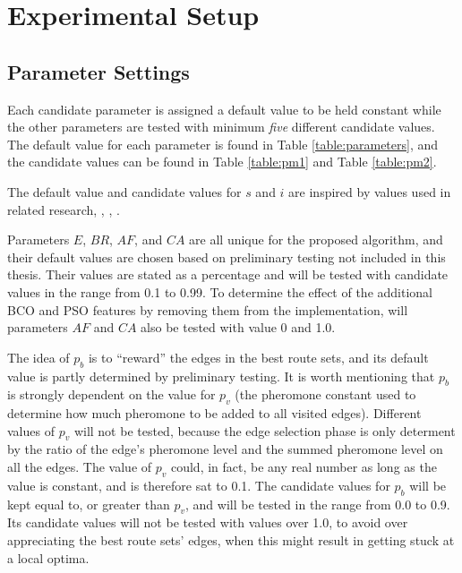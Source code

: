 \section{Experimental Setup}
\label{sec:expSetup}

\subsection{Parameter Settings}
\label{subsec:parameterSettings_setup}

Each candidate parameter is assigned a default value to be held constant while the other parameters are tested with minimum \textit{five} different candidate values. The default value for each parameter is found in Table \vref{table:parameters}, and the candidate values can be found in Table \vref{table:pm1} and Table \vref{table:pm2}.

The default value and candidate values for $s$ and $i$ are inspired by values used in related research\citep{salehi-nezhad07}, \citep{poorzahedy11}, \citep{sedighpour14}, \citep{kechagiopoulos14}.

Parameters $E$, $BR$, $AF$, and $CA$ are all unique for the proposed algorithm, and their default values are chosen based on preliminary testing not included in this thesis. Their values are stated as a percentage and will be tested with candidate values in the range from 0.1 to 0.99. To determine the effect of the additional BCO and PSO features by removing them from the implementation, will parameters $AF$ and $CA$ also be tested with value 0 and 1.0.

The idea of $p_b$ is to ``reward'' the edges in the best route sets, and its default value is partly determined by preliminary testing. It is worth mentioning that $p_ b$ is strongly dependent on the value for $p_v$ (the pheromone constant used to determine how much pheromone to be added to all visited edges). Different values of $p_v$ will not be tested, because the edge selection phase is only determent by the ratio of the edge's pheromone level and the summed pheromone level on all the edges. The value of $p_v$ could, in fact, be any real number as long as the value is constant, and is therefore sat to 0.1. The candidate values for $p_b$ will be kept equal to, or greater than $p_v$, and will be tested in the range from 0.0 to 0.9. Its candidate values will not be tested with values over 1.0, to avoid over appreciating the best route sets' edges, when this might result in getting stuck at a local optima.

